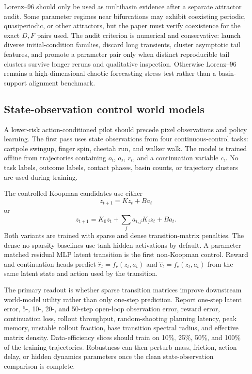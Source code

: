 Lorenz--96 should only be used as multibasin evidence after a separate attractor audit. Some parameter regimes near bifurcations may exhibit coexisting periodic, quasiperiodic, or other attractors, but the paper must verify coexistence for the exact \(D,F\) pairs used. The audit criterion is numerical and conservative: launch diverse initial-condition families, discard long transients, cluster asymptotic tail features, and promote a parameter pair only when distinct reproducible tail clusters survive longer reruns and qualitative inspection. Otherwise Lorenz--96 remains a high-dimensional chaotic forecasting stress test rather than a basin-support alignment benchmark.

\subsection{State-observation control world models}
\label{app:control_world_models}

A lower-risk action-conditioned pilot should precede pixel observations and policy learning. The first pass uses state observations from four continuous-control tasks: cartpole swingup, finger spin, cheetah run, and walker walk. The model is trained offline from trajectories containing \(o_t\), \(a_t\), \(r_t\), and a continuation variable \(c_t\). No task labels, outcome labels, contact phases, basin counts, or trajectory clusters are used during training.

The controlled Koopman candidates use either
\begin{equation}
  z_{t+1}=Kz_t+Ba_t
\end{equation}
or
\begin{equation}
  z_{t+1}=K_0z_t+\sum_j a_{t,j}K_jz_t+Ba_t.
\end{equation}
Both variants are trained with sparse and dense transition-matrix penalties. The dense no-sparsity baselines use tanh hidden activations by default. A parameter-matched residual MLP latent transition is the first non-Koopman control. Reward and continuation heads predict \(\hat r_t=f_r(z_t,a_t)\) and \(\hat c_t=f_c(z_t,a_t)\) from the same latent state and action used by the transition.

The primary readout is whether sparse transition matrices improve downstream world-model utility rather than only one-step prediction. Report one-step latent error, 5-, 10-, 20-, and 50-step open-loop observation error, reward error, continuation loss, rollout throughput, random-shooting planning latency, peak memory, unstable rollout fraction, base transition spectral radius, and effective matrix density. Data-efficiency slices should train on 10\%, 25\%, 50\%, and 100\% of the training trajectories. Robustness can then perturb mass, friction, action delay, or hidden dynamics parameters once the clean state-observation comparison is complete.


